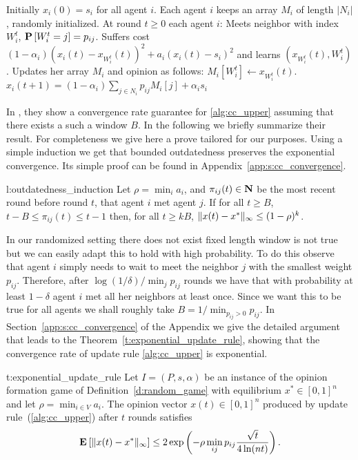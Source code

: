 \begin{algorithm*}
  \caption{Asynchronous Update Rule}
  \label{alg:cc_upper}
  \begin{algorithmic}[1]
    \STATE Initially $x_i(0) = s_i$ for all agent $i$.
    \STATE Each agent $i$ keeps an array $M_i$ of length $|N_i|$,
    randomly initialized.
    \STATE At round $t\geq 0$ each agent $i$:
    \bindent
    \STATE Meets neighbor with index $W_i^t$, $\bm{\mathrm{P}}\left[W_i^t=j\right]=p_{ij}$.
    \STATE Suffers cost \((1-\alpha_i) (x_i(t) - x_{W_i^t}(t))^2 + a_i (x_i(t) - s_i)^2\)
    and learns $(x_{W_i^t}(t),W_i^t)$.
    \STATE Updates her array $M_i$ and opinion as follows:
      \bindent
      \STATE $M_i[W_i^t] \gets x_{W_i^t}(t)$.
      \STATE $x_i(t+1) = (1-\alpha_i)\sum_{j \in N_i} p_{ij} M_i[j] + \alpha_is_i$
      \eindent
    \eindent
  \end{algorithmic}
\end{algorithm*}

In \cite{BT97}, they show a convergence rate guarantee for
\ref{alg:cc_upper} assuming that there exists a such a window $B$.
In the  following we briefly summarize their result.  For completeness we
give here a prove tailored for our purposes.
Using a simple induction we get that bounded outdatedness
preserves the exponential convergence.  Its simple proof can be found in
Appendix~\ref{app:s:cc_convergence}.

\begin{replemma}{l:outdatedness_induction}
  Let $\rho = \min_i a_i$, and $\pi_{ij}(t) \in \bm{\mathrm{N}}$ be the most recent round
  before round $t$, that agent $i$ met agent $j$.
  If for all $t\geq B$, $t-B \leq \pi_{ij}(t) \leq t-1$ then, for
  all $t \geq k B$,
  \(\| x(t) - x^* \|_{\infty} \leq (1-\rho)^k\).
\end{replemma}

In our randomized setting there does not exist fixed length window is
not true but we can easily adapt this to hold with high probability.
To do this observe that agent $i$ simply needs to wait to meet the neighbor
$j$ with the smallest weight $p_{ij}$. Therefore, after
$\log(1/\delta)/\min_{j} p_{ij}$ rounds we have that with probability at least
$1-\delta$ agent $i$ met all her neighbors at least once.
Since we want this to be true for all agents
we shall roughly take $B = 1/\min_{p_{ij} > 0} {p_{ij}}$.
In Section~\ref{app:s:cc_convergence} of the Appendix we give the detailed
argument that leads to the Theorem~\ref{t:exponential_update_rule},
showing that the convergence rate of update rule \ref{alg:cc_upper} is exponential.

\begin{reptheorem}{t:exponential_update_rule}
  Let $I = (P,s, \alpha)$ be an instance of the opinion formation
  game of Definition~\ref{d:random_game} with equilibrium
  $x^* \in [0,1]^n$ and let $\rho = \min_{i \in V} a_i$.
  The opinion vector $x(t)\in[0,1]^n$ produced by
  update rule~(\ref{alg:cc_upper}) after $t$ rounds satisfies
  \[
    \Exp{\norm{\infty}{x(t) - x^*}}
    \leq
    2\exp \lp(- \rho  \min_{ij} p_{ij} \frac{\sqrt{t}}{4\ln(nt)} \rp).
  \]
\end{reptheorem}
